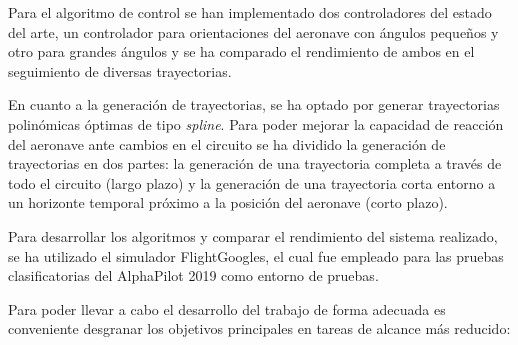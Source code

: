 Para el algoritmo de control se han implementado dos controladores del estado del arte, un controlador para orientaciones del aeronave con ángulos pequeños y otro para grandes ángulos y se ha comparado el rendimiento de ambos en el seguimiento de diversas trayectorias.

En cuanto a la generación de trayectorias, se ha optado por generar trayectorias polinómicas óptimas de tipo \textit{spline}. Para poder mejorar la capacidad de reacción del aeronave ante cambios en el circuito se ha dividido la generación de trayectorias en dos partes: la generación de una trayectoria completa a través de todo el circuito (largo plazo) y la generación de una trayectoria corta entorno a un horizonte temporal próximo a la posición del aeronave (corto plazo).

Para desarrollar los algoritmos y comparar el rendimiento del sistema realizado, se ha utilizado el simulador FlightGoogles, el cual fue empleado para las pruebas clasificatorias del AlphaPilot 2019 como entorno de pruebas.



Para poder llevar a cabo el desarrollo del trabajo de forma adecuada es conveniente desgranar los objetivos principales en tareas de alcance más reducido:

